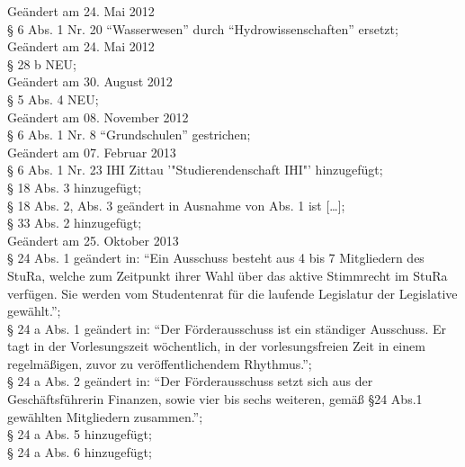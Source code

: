 Geändert am 24. Mai 2012\\
§ 6 Abs. 1 Nr. 20 "`Wasserwesen"' durch "`Hydrowissenschaften"' ersetzt; \\

Geändert am 24. Mai 2012\\
§ 28 b NEU; \\

Geändert am 30. August 2012\\
§ 5 Abs. 4 NEU; \\

Geändert am 08. November 2012\\
§ 6 Abs. 1 Nr. 8 "`Grundschulen"' gestrichen; \\

Geändert am 07. Februar 2013\\
§ 6 Abs. 1 Nr. 23 IHI Zittau '"Studierendenschaft IHI"' hinzugefügt; \\
§ 18 Abs. 3 hinzugefügt; \\
§ 18 Abs. 2, Abs. 3 geändert in Ausnahme von Abs. 1 ist [\ldots]; \\
§ 33 Abs. 2 hinzugefügt; \\

Geändert am 25. Oktober 2013 \\
§ 24 Abs. 1 geändert in: "`Ein Ausschuss besteht aus 4 bis 7 Mitgliedern des StuRa, welche zum Zeitpunkt ihrer Wahl über das aktive Stimmrecht im StuRa verfügen. Sie werden vom Studentenrat für die laufende Legislatur der Legislative gewählt."'; \\
§ 24 a Abs. 1 geändert in: "`Der Förderausschuss ist ein ständiger Ausschuss. Er tagt in der Vorlesungszeit wöchentlich, in der vorlesungsfreien Zeit in einem regelmäßigen, zuvor zu veröffentlichendem Rhythmus."'; \\
§ 24 a Abs. 2 geändert in: "`Der Förderausschuss setzt sich aus der Geschäftsführerin Finanzen, sowie vier bis sechs weiteren, gemäß §24 Abs.1 gewählten Mitgliedern zusammen."'; \\
§ 24 a Abs. 5 hinzugefügt; \\
§ 24 a Abs. 6 hinzugefügt; \\

\normalsize
